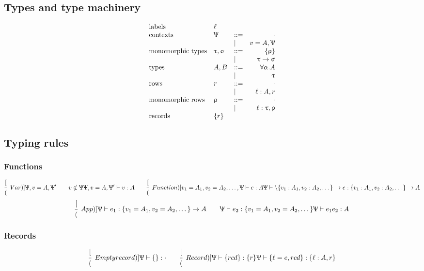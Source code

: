 \documentclass{article}
\newcommand{\define}{::=}
\newcommand{\arrow}{\to}
\newcommand{\rcd}[1]{\{#1\}}
\newcommand{\emptyrow}{\cdot}
\newcommand{\spc}{\qquad}
\newcommand{\declCtx}{\Uppsi}
\newcommand{\derives}[3]{#1 \vdash #2 : #3}
\newcommand{\lbl}{\ell}
\newcommand{\expr}{e}
\newcommand{\var}{v}
\newcommand{\row}{r}
\newcommand{\rowm}{\uprho}
\newcommand{\tp}{A}
\newcommand{\tpalt}{B}
\newcommand{\tpm}{\uptau}
\newcommand{\tpmalt}{\upsigma}
\newcommand{\tvar}{\alpha}
\newcommand{\deduct}[3][]
{
  \begin{prooftree}
    \hypo{#2}
    \infer1[\text{#1}]{#3}
  \end{prooftree}
}
\begin{document}
\subsection{Types and type machinery}

\[
  \begin{array}{lllrl}
    \text{labels} & \lbl & & \\
    \text{contexts} & \declCtx & \define & \cdot \\
    & & | & v = \tp, \declCtx \\
    \text{monomorphic types} & \tpm, \tpmalt & \define & \rcd \uprho  \\
    & & | & \tpm \arrow \tpmalt \\
    \text{types} & \tp, \tpalt & \define & \forall \tvar. \tp \\
    & & | & \tpm \\
    \text{rows} & \row & \define & \emptyrow  \\
    & & | & \lbl : \tp, \row \\
    \text{monomorphic rows} & \rowm & \define & \emptyrow  \\
    & & | & \lbl : \tpm, \rowm  \\
    \text{records} & \{\row\} & &
  \end{array}
\]

\subsection{Typing rules}

\subsubsection{Functions}
\[
  \deduct
  [(Var)]
  {\declCtx, \var = \tp, \declCtx' \spc \var \notin \declCtx}
  {\derives {\declCtx, \var = \tp, \declCtx'} \var \tp}
  \spc
  \deduct
  [(Function)]
  {\derives {\var_1=\tp_1,\var_2=\tp_2,\dots,\declCtx} \expr \tp}
  {\derives \declCtx {\backslash \rcd{\var_1: \tp_1, \var_2 : \tp_2, \dots} \arrow \expr} { \rcd{\var_1: \tp_1, \var_2 : \tp_2, \dots}
      \arrow \tp}}
\]
\[
  \deduct
  [(App)]
  {\derives \declCtx {\expr_1} {\rcd{\var_1=\tp_1,\var_2=\tp_2,\dots} \arrow \tp} \spc \derives \declCtx
    {\expr_2} {\rcd{\var_1=\tp_1,\var_2=\tp_2,\dots}}}
  {\derives \declCtx {\expr_1 \expr_2} \tp}
\]

\subsubsection{Records}
\[
  \deduct
  [(Empty record)]
  {}
  {\derives \declCtx {\rcd{}} \emptyrow}
  \spc
  \deduct
  [(Record)]
  {\derives \declCtx {\rcd {rcd}} {\rcd \row}}
  {\derives \declCtx {\rcd{\lbl=e,rcd}} {\rcd{\lbl : \tp, \row}}}
\]
\end{document}
